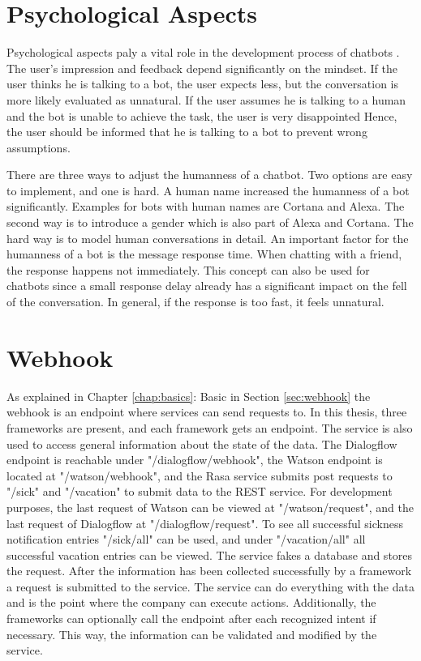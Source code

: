 \section{Psychological Aspects}
Psychological aspects paly a vital role in the development process of chatbots \citet{brandtzaeg2018chatbots}.
The user's impression and feedback depend significantly on the mindset.
If the user thinks he is talking to a bot, the user expects less, but the conversation is more likely evaluated as unnatural.
If the user assumes he is talking to a human and the bot is unable to achieve the task, the user is very disappointed
Hence, the user should be informed that he is talking to a bot to prevent wrong assumptions.

There are three ways to adjust the humanness of a chatbot.
Two options are easy to implement, and one is hard.
A human name increased the humanness of a bot significantly.
Examples for bots with human names are Cortana and Alexa.
The second way is to introduce a gender which is also part of Alexa and Cortana.
The hard way is to model human conversations in detail.
An important factor for the humanness of a bot is the message response time.
When chatting with a friend, the response happens not immediately.
This concept can also be used for chatbots since a small response delay already has a significant impact on the fell of the conversation.
In general, if the response is too fast, it feels unnatural.

\section{Webhook}
As explained in Chapter \ref{chap:basics}: Basic in Section \ref{sec:webhook} 
the webhook is an endpoint where services can send requests to.
In this thesis, three frameworks are present, and each framework gets an endpoint.
The service is also used to access general information about the state of the data.
The Dialogflow endpoint is reachable under "/dialogflow/webhook",
the Watson endpoint is located at "/watson/webhook",
and the Rasa service submits post requests to "/sick" and "/vacation" to submit data to the REST service.
For development purposes, the last request of Watson can be viewed at "/watson/request", and the last request of Dialogflow at "/dialogflow/request".
To see all successful sickness notification entries "/sick/all" can be used, and under "/vacation/all" all successful vacation entries can be viewed.
The service fakes a database and stores the request.
After the information has been collected successfully by a framework a request is submitted to the service.
The service can do everything with the data and is the point where the company can execute actions.
Additionally, the frameworks can optionally call the endpoint after each recognized intent if necessary.
This way, the information can be validated and modified by the service.

